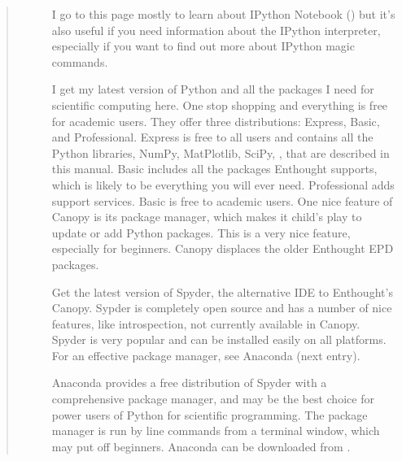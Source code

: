 \documentclass[letterpaper,10pt,english]{sphinxmanual}
\begin{document}
\begin{quote}
\begin{description}
\item[{}] \leavevmode
\sphinxAtStartPar
I go to this page mostly to learn about IPython Notebook () but it’s also useful if you need information about the IPython interpreter, especially if you want to find out more about IPython magic commands.

\end{description}

\ignorespaces \begin{description}
\item[{}] \leavevmode
\sphinxAtStartPar
I get my latest version of Python and all the packages I need for scientific computing here.  One stop shopping and everything is free for academic users.  They offer three distributions: Express, Basic, and Professional.  Express is free to all users and contains all the Python libraries, NumPy, MatPlotlib, SciPy, , that are described in this manual.  Basic includes all the packages Enthought supports, which is likely to be everything you will ever need.  Professional adds support services.  Basic is free to academic users.  One nice feature of Canopy is its package manager, which makes it child’s play to update or add Python packages.  This is a very nice feature, especially for beginners.  Canopy displaces the older Enthought EPD packages.

\end{description}

\ignorespaces \begin{description}
\item[{}] \leavevmode
\sphinxAtStartPar
Get the latest version of Spyder, the alternative IDE to Enthought’s Canopy.  Sypder is completely open source and has a number of nice features, like introspection, not currently available in Canopy.  Spyder is very popular and can be installed easily on all platforms.  For an effective package manager, see Anaconda (next entry).

\end{description}

\ignorespaces \begin{description}
\item[{}] \leavevmode
\sphinxAtStartPar
Anaconda provides a free distribution of Spyder with a comprehensive package manager, and may be the best choice for power users of Python for scientific programming.  The package manager is run by line commands from a terminal window, which may put off beginners.  Anaconda can be downloaded from .


\end{description}
\end{quote}
\end{document}
